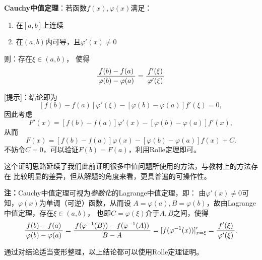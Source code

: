 \begin{thx}
	{\bf Cauchy中值定理}：若函数$f(x),\varphi(x)$满足： 
	\begin{enumerate}[(1)]
	  \setlength{\itemindent}{1cm}
	  \item 在$[a,b]$上连续 
	  \item 在$(a,b)$内可导，且$\varphi'(x)\ne 0$ 
	\end{enumerate}
	则：存在$\xi\in(a,b)$， 使得
	$$\displaystyle\frac{\,{f(b)-f(a)}\,}{\,{\varphi(b)-\varphi(a)}\,}=\displaystyle\frac{\,{f'(\xi)}\,}{\,{\varphi'(\xi)}\,}$$
\end{thx}

[提示]：结论即为
$$[f(b)-f(a)]\varphi'(\xi)-[\varphi(b)-\varphi(a)]f'(\xi)=0,$$
因此考虑
$$F'(x)=[f(b)-f(a)]\varphi'(x)-[\varphi(b)-\varphi(a)]f'(x),$$
从而
$$F(x)=[f(b)-f(a)]\varphi(x)-[\varphi(b)-\varphi(a)]f(x)+C.$$
不妨令$C=0$，可以验证$F(b)=F(a)$，利用Rolle定理即可。

这个证明思路延续了我们此前证明很多中值问题所使用的方法，与教材上的方法存在
比较明显的差异，但从解题的角度来看，更具普遍的可操作性。

{\bf 注：}Cauchy中值定理可视为{\it 参数化}的Lagrange中值定理，即：
由$\varphi'(x)\ne 0$可知，$\varphi(x)$为单调（可逆）函数，从而设
$A=\varphi(a),B=\varphi(b)$，故由Lagrange中值定理，存在$\xi\in(a,b)$，
也即$C=\varphi(\xi)$介于$A,B$之间，使得
$$\displaystyle\frac{\,{f(b)-f(a)}\,}{\,{\varphi(b)-\varphi(a)}\,}
=\displaystyle\frac{\,{f(\varphi^{-1}(B))-f(\varphi^{-1}(A))}\,}{\,{B-A}\,}
=[f(\varphi^{-1}(x))]'_{x=\xi}=\displaystyle\frac{\,{f'(\xi)}\,}{\,{\varphi'(\xi)}\,}.$$

通过对结论适当变形整理，以上结论都可以使用Rolle定理证明。

